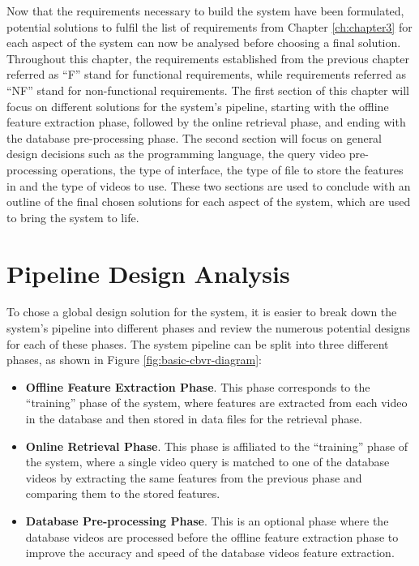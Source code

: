 Now that the requirements necessary to build the system have been formulated, potential solutions to fulfil the list of requirements from Chapter \ref{ch:chapter3} for each aspect of the system can now be analysed before choosing a final solution. Throughout this chapter, the requirements established from the previous chapter referred as ``F'' stand for functional requirements, while requirements referred as ``NF'' stand for non-functional requirements. The first section of this chapter will focus on different solutions for the system's pipeline, starting with the offline feature extraction phase, followed by the online retrieval phase, and ending with the database pre-processing phase. The second section will focus on general design decisions such as the programming language, the query video pre-processing operations, the type of interface, the type of file to store the features in and the type of videos to use. These two sections are used to conclude with an outline of the final chosen solutions for each aspect of the system, which are used to bring the system to life.

\section{Pipeline Design Analysis}

To chose a global design solution for the system, it is easier to break down the system's pipeline into different phases and review the numerous potential designs for each of these phases. The system pipeline can be split into three different phases, as shown in Figure \ref{fig:basic-cbvr-diagram}:

\begin{itemize}
    \item \textbf{Offline Feature Extraction Phase}. This phase corresponds to the ``training'' phase of the system, where features are extracted from each video in the database and then stored in data files for the retrieval phase.
    \item \textbf{Online Retrieval Phase}. This phase is affiliated to the ``training'' phase of the system, where a single video query is matched to one of the database videos by extracting the same features from the previous phase and comparing them to the stored features.
    \item \textbf{Database Pre-processing Phase}. This is an optional phase where the database videos are processed before the offline feature extraction phase to improve the accuracy and speed of the database videos feature extraction.
\end{itemize}

